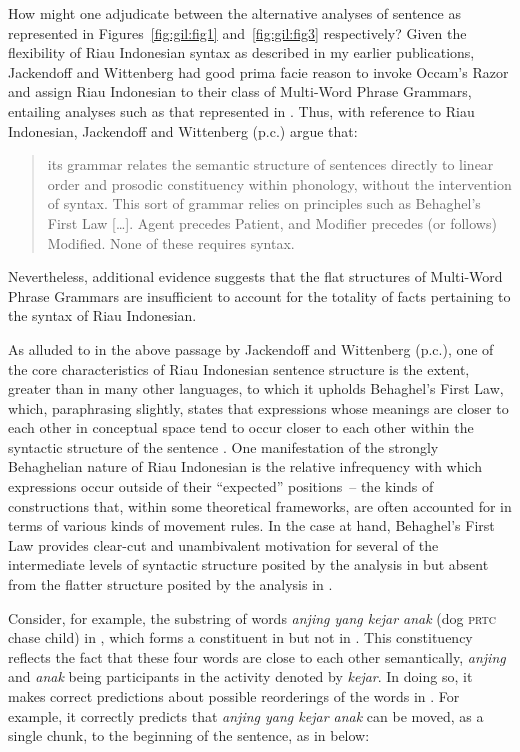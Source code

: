 \documentclass[output=paper,colorlinks,citecolor=brown
]{langscibook}
\begin{document}
How might one adjudicate between the alternative analyses of sentence  as represented in Figures~\ref{fig:gil:fig1} and~\ref{fig:gil:fig3} respectively?  Given the flexibility of Riau Indonesian syntax as described in my earlier publications, Jackendoff and Wittenberg had good prima facie reason to invoke Occam's Razor and assign Riau Indonesian to their class of Multi-Word Phrase Grammars, entailing analyses such as that represented in .  Thus, with reference to Riau Indonesian, Jackendoff and Wittenberg (p.c.) argue that:

\begin{quote}
      its grammar relates the semantic structure of sentences directly to linear order and
     prosodic constituency within phonology, without the intervention of syntax.  This sort of
     grammar relies on principles such as Behaghel’s First Law  [\ldots]. Agent precedes Patient, and
     Modifier precedes (or follows) Modified.  None of these requires syntax.
\end{quote}

Nevertheless, additional evidence suggests that the flat structures of Multi-Word Phrase Grammars are insufficient to account for the totality of facts pertaining to the syntax of Riau Indonesian.

As alluded to in the above passage by Jackendoff and Wittenberg (p.c.), one of the core characteristics of Riau Indonesian sentence structure is the extent, greater than in many other languages, to which it upholds Behaghel's First Law, which, paraphrasing slightly, states that expressions whose meanings are closer to each other in conceptual space tend to occur closer to each other within the syntactic structure of the sentence \citep{behaghel1932deutsche}.  One manifestation of the strongly Behaghelian nature of Riau Indonesian is the relative infrequency with which expressions occur outside of their ``expected'' positions~– the kinds of constructions that, within some theoretical frameworks, are often accounted for in terms of various kinds of movement rules.  In the case at hand, Behaghel's First Law provides clear-cut and unambivalent motivation for several of the intermediate levels of syntactic structure posited by the analysis in  but absent from the flatter structure posited by the analysis in .

Consider, for example, the substring of words \textit{anjing yang kejar anak} (dog \textsc{prtc} chase child) in , which forms a constituent in  but not in .  This constituency reflects the fact that these four words are close to each other semantically, \textit{anjing} and \textit{anak} being participants in the activity denoted by \textit{kejar}.  In doing so, it makes correct predictions about possible reorderings of the words in .  For example, it correctly predicts that \textit{anjing yang kejar anak} can be moved, as a single chunk, to the beginning of the sentence, as in  below:
\end{document}
